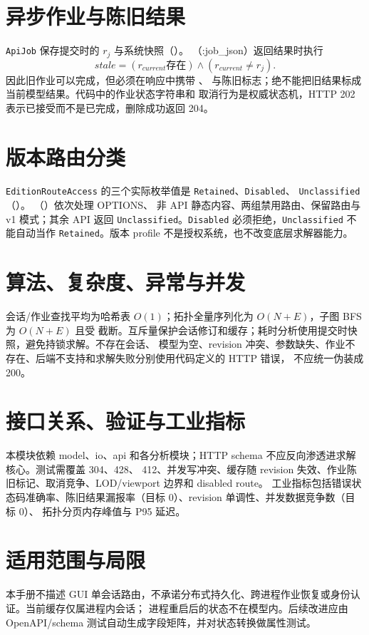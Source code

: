 \documentclass[UTF8,fontset=fandol,a4paper,11pt]{ctexart}
\begin{document}
\section{异步作业与陈旧结果}
\texttt{ApiJob} 保存提交时的 $r_j$ 与系统快照（）。
（:job\_json）返回结果时执行
\begin{equation}
stale=(r_{current}\text{存在})\land(r_{current}\ne r_j).
\end{equation}
因此旧作业可以完成，但必须在响应中携带 、
 与陈旧标志；绝不能把旧结果标成当前模型结果。代码中的作业状态字符串和
取消行为是权威状态机，HTTP 202 表示已接受而不是已完成，删除成功返回 204。

\section{版本路由分类}
\texttt{EditionRouteAccess} 的三个实际枚举值是 \texttt{Retained}、\texttt{Disabled}、
\texttt{Unclassified}（）。
（）依次处理 OPTIONS、
非 API 静态内容、两组禁用路由、保留路由与 v1 模式；其余 API 返回
\texttt{Unclassified}。\texttt{Disabled} 必须拒绝，\texttt{Unclassified} 不能自动当作
\texttt{Retained}。版本 profile 不是授权系统，也不改变底层求解器能力。

\section{算法、复杂度、异常与并发}
会话/作业查找平均为哈希表 $O(1)$；拓扑全量序列化为 $O(N+E)$，子图 BFS 为 $O(N+E)$ 且受
 截断。互斥量保护会话修订和缓存；耗时分析使用提交时快照，避免持锁求解。不存在会话、
模型为空、revision 冲突、参数缺失、作业不存在、后端不支持和求解失败分别使用代码定义的 HTTP 错误，
不应统一伪装成 200。

\section{接口关系、验证与工业指标}
本模块依赖 model、io、api 和各分析模块；HTTP schema 不应反向渗透进求解核心。测试需覆盖 304、428、
412、并发写冲突、缓存随 revision 失效、作业陈旧标记、取消竞争、LOD/viewport 边界和 disabled route。
工业指标包括错误状态码准确率、陈旧结果漏报率（目标 0）、revision 单调性、并发数据竞争数（目标 0）、
拓扑分页内存峰值与 P95 延迟。

\section{适用范围与局限}
本手册不描述 GUI 单会话路由，不承诺分布式持久化、跨进程作业恢复或身份认证。当前缓存仅属进程内会话；
进程重启后的状态不在模型内。后续改进应由 OpenAPI/schema 测试自动生成字段矩阵，并对状态转换做属性测试。



\end{document}
